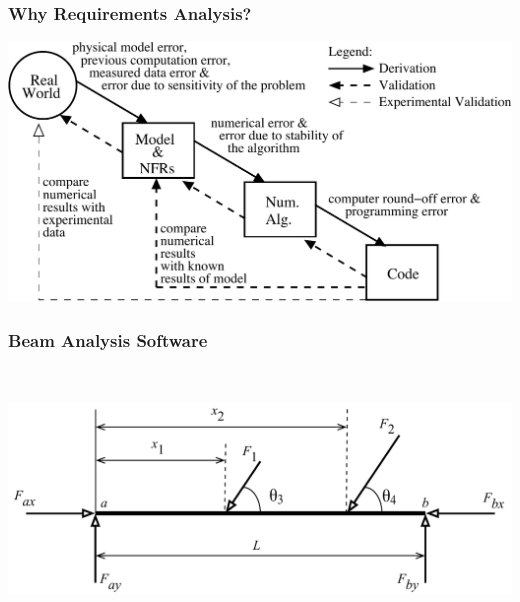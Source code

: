 \documentclass[t,12pt,numbers,fleqn]{beamer}
\begin{document}

\begin{frame}
\frametitle{Why Requirements Analysis?}
\begin{center}
 \includegraphics[width=1.0\textwidth]{../Figures/StagesInSciCompErrors.pdf}
\end{center}
\end{frame}


\begin{frame}
\frametitle{Beam Analysis Software}
~\newline
~\newline
\begin{center}
 \includegraphics[width=1.0\textwidth]{../Figures/beamFBD.pdf}
\end{center}
\end{frame}

\end{document}
